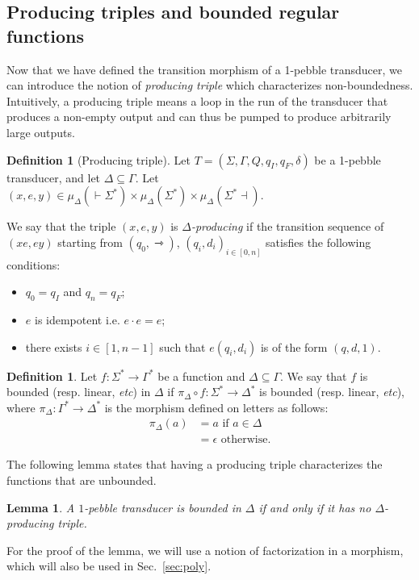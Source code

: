 \documentclass{article}
\newcommand{\mright}{\rightarrowtriangle}
\newtheorem{lemma}[theorem]{Lemma}
\theoremstyle{definition}
\newtheorem{definition}[theorem]{Definition}
\theoremstyle{remark}
\begin{document}
\subsection{Producing triples and bounded regular functions}
Now that we have defined the transition morphism of a 1-pebble transducer, we can introduce the notion of \emph{producing triple} which characterizes non-boundedness. Intuitively, a producing triple means a loop in the run of the transducer that produces a non-empty output and can thus be pumped to produce arbitrarily large outputs.


\begin{definition}[Producing triple]
Let $T=(\Sigma,\Gamma,Q,q_I,q_F, \delta)$ be a 1-pebble transducer, and let $\Delta\subseteq \Gamma$. Let $(x, e, y)\in \mu_\Delta( { \vdash}\Sigma^*)\times \mu_\Delta( \Sigma^*)\times \mu_\Delta( \Sigma^*{ \dashv})$.

We say that the triple $(x,e,y)$ is \emph{$\Delta$-producing} if the transition sequence of $(xe,ey)$ starting from $(q_0,\mright)$, 
$(q_i,d_i)_{i\in[0,n]}$ satisfies the following conditions:
\begin{itemize}
\item $q_0=q_I$ and $q_n=q_F$;
\item $e$ is idempotent i.e. $e\cdot e=e$;
\item there exists $i\in [1,n-1]$ such that $e(q_i,d_i)$ is of the form $(q,d,1)$.
\end{itemize}
\end{definition}

 \begin{definition}
Let $f:\Sigma^*\to \Gamma^*$ be a function and $\Delta\subseteq\Gamma$. We say that $f$ is bounded (resp. linear, \textit{etc}) in $\Delta$ if $\pi_\Delta\circ f: \Sigma^*\to \Delta^*$ is bounded (resp. linear, \textit{etc}), where $\pi_\Delta:\Gamma^*\to \Delta^*$ is the morphism defined on letters as follows:
\begin{align*}
\pi_\Delta(a)&=a \text{ if }  a\in \Delta \\
&= \epsilon \text{ otherwise.}
\end{align*}
 \end{definition}
The following lemma states that having a producing triple characterizes the functions that are unbounded.
\begin{lemma}\label{thm:linear}
A $1$-pebble transducer is bounded in $\Delta$ if and only if it has no $\Delta$-producing triple.
\end{lemma}
For the proof of the lemma, we will use a notion of factorization in a morphism, which will also be used in Sec.~\ref{sec:poly}.
\end{document}
